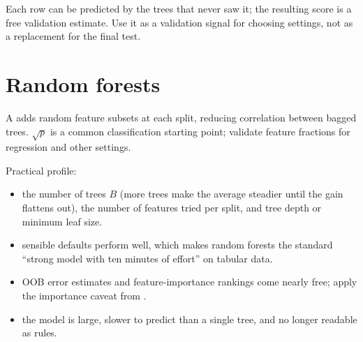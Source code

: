 \begin{mlfigure}
\end{mlfigure}

Each row can be predicted by the trees that never saw it; the resulting  score is a free validation estimate. Use it as a validation signal for choosing settings, not as a replacement for the final test.

\section{Random forests}
\label{sec:random-forest}

A  adds random feature subsets at each split, reducing correlation between bagged trees. $\sqrt p$ is a common classification starting point; validate feature fractions for regression and other settings.

Practical profile:

\begin{itemize}
  \item {} the number of trees $B$ (more trees make the average steadier until the gain flattens out), the number of features tried per split, and tree depth or minimum leaf size.
  \item {} sensible defaults perform well, which makes random forests the standard ``strong model with ten minutes of effort'' on tabular data.
  \item {} OOB error estimates and feature-importance rankings come nearly free; apply the importance caveat from .
  \item {} the model is large, slower to predict than a single tree, and no longer readable as rules.
\end{itemize}

